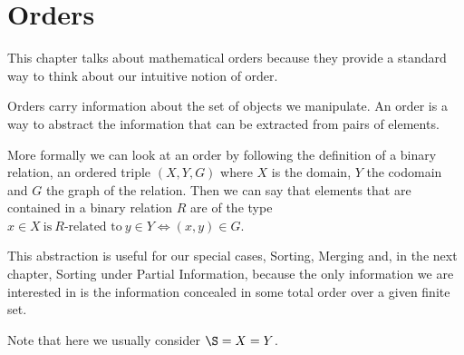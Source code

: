 \section{Orders}

This chapter talks about mathematical orders because they provide a standard
way to think about our intuitive notion of order.

Orders carry information about the set of objects we manipulate. An order is a
way to abstract the information that can be extracted from pairs of elements.

More formally we can look at an order by following the definition of a binary
relation, an ordered triple $(X, Y, G)$ where $X$ is the domain, $Y$ the
codomain and $G$ the graph of the relation.
Then we can say that elements that are contained in a binary relation $R$ are
of the type $x \in X~\text{is}~R\text{-related to}~y \in Y \iff (x, y) \in G$.

This abstraction is useful for our special cases, \ie Sorting, Merging and, in
the next chapter, Sorting under Partial Information, because the only
information we are interested in is the information concealed in some total
order over a given finite set.

Note that here we usually consider \(\S = X = Y\).
